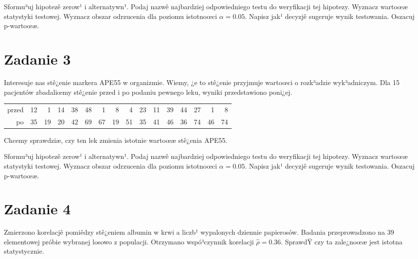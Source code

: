 \documentclass[a4paper,12pt]{article}
\begin{document}
  Sformu³uj hipotezê zerow¹ i alternatywn¹. 
  Podaj nazwê najbardziej odpowiedniego testu do weryfikacji tej hipotezy. 
  Wyznacz wartoœæ statystyki testowej. 
  Wyznacz obszar odrzucenia dla poziomu istotnoœci $\alpha=0.05$. 
  Napisz jak¹ decyzjê sugeruje wynik testowania. Oszacuj p-wartoœæ. \vspace{1cm} 

  \section*{Zadanie 3}
     
  Interesuje nas stê¿enie markera APE55  w organizmie. 
  Wiemy, ¿e to stê¿enie przyjmuje wartoœci o rozk³adzie wyk³adniczym. 
  Dla 15 pacjentów zbadaliœmy stê¿enie przed i po podaniu pewnego leku, 
  wyniki przedstawiono poni¿ej.
  
  \vspace{0.5cm} 
  \noindent\begin{center} 
\begin{tabular}{rrrrrrrrrrrrrrrr}
  \hline
  \hline
przed & 12 & 1 & 14 & 38 & 48 & 1 & 8 & 4 & 23 & 11 & 39 & 44 & 27 & 1 & 8 \\
  po & 35 & 19 & 20 & 42 & 69 & 67 & 19 & 51 & 35 & 41 & 46 & 36 & 74 & 46 & 74 \\
   \hline
\end{tabular}
 
  \end{center} 
  \vspace{0.5cm}
  
  Chcemy sprawdziæ, czy ten lek zmienia istotnie wartoœæ stê¿enia APE55.
  
  Sformu³uj hipotezê zerow¹ i alternatywn¹. 
  Podaj nazwê najbardziej odpowiedniego testu do weryfikacji tej hipotezy. 
  Wyznacz wartoœæ statystyki testowej. 
  Wyznacz obszar odrzucenia dla poziomu istotnoœci $\alpha=0.05$. 
  Napisz jak¹ decyzjê sugeruje wynik testowania. Oszacuj p-wartoœæ. \vspace{1cm} 

  \section*{Zadanie 4}
     
     Zmierzono korelacjê pomiêdzy stê¿eniem albumin w krwi a liczb¹ wypalonych dziennie papierosów. 
     Badania przeprowadzono na 39 elementowej próbie wybranej losowo z populacji. 
     Otrzymano wspó³czynnik korelacji $\hat\rho = 0.36 $. 
     SprawdŸ czy ta zale¿noœæ jest istotna statystycznie. 
     
\end{document}
